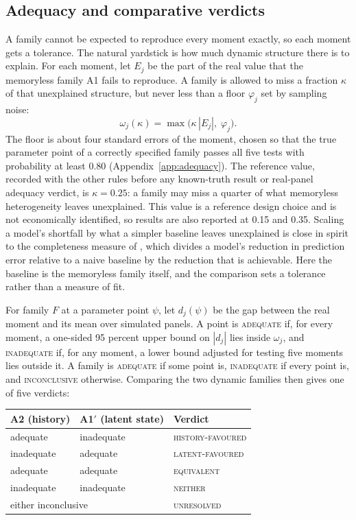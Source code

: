 \documentclass[11pt]{article}
\newcommand{\verdict}[1]{\textsc{#1}}
\begin{document}
\subsection{Adequacy and comparative verdicts}

A family cannot be expected to reproduce every moment exactly, so each moment gets a
tolerance. The natural yardstick is how much dynamic structure there is to explain. For each
moment, let $E_j$ be the part of the real value that the memoryless family A1 fails to
reproduce. A family is allowed to miss a fraction $\kappa$ of that unexplained structure, but
never less than a floor $\varphi_j$ set by sampling noise:
\begin{equation}
\omega_j(\kappa)=\max\big(\kappa\,|E_j|,\;\varphi_j\big).
\label{eq:tolerance}
\end{equation}
The floor is about four standard errors of the moment, chosen so that the true parameter point
of a correctly specified family passes all five tests with probability at least 0.80
(Appendix~\ref{app:adequacy}). The reference
value, recorded with the other rules before any known-truth result or real-panel adequacy
verdict, is $\kappa=0.25$: a family may miss a quarter of what memoryless
heterogeneity leaves unexplained. This value is a reference design choice and is not
economically identified, so results are also reported at 0.15 and 0.35. Scaling a model's
shortfall by what a simpler baseline leaves unexplained is close in spirit to the completeness
measure of \citet{fudenberg2022}, which divides a model's reduction in prediction error relative
to a naive baseline by the reduction that is achievable. Here the baseline is the memoryless
family itself, and the comparison sets a tolerance rather than a measure of fit.

For family $F$ at a parameter point $\psi$, let $d_j(\psi)$ be the gap between the real moment
and its mean over simulated panels. A point is \verdict{adequate} if, for every moment, a
one-sided 95 percent upper bound on $|d_j|$ lies inside $\omega_j$, and \verdict{inadequate}
if, for any moment, a lower bound adjusted for testing five moments lies outside it. A family
is \verdict{adequate} if some point is, \verdict{inadequate} if every point is, and
\verdict{inconclusive} otherwise. Comparing the two dynamic families then gives one of five
verdicts:

\begin{center}\small
\begin{tabular}{lll}
\toprule
A2 (history) & A1$'$ (latent state) & Verdict \\
\midrule
adequate & inadequate & \verdict{history-favoured} \\
inadequate & adequate & \verdict{latent-favoured} \\
adequate & adequate & \verdict{equivalent} \\
inadequate & inadequate & \verdict{neither} \\
\multicolumn{2}{l}{either inconclusive} & \verdict{unresolved} \\
\bottomrule
\end{tabular}
\end{center}
\end{document}
